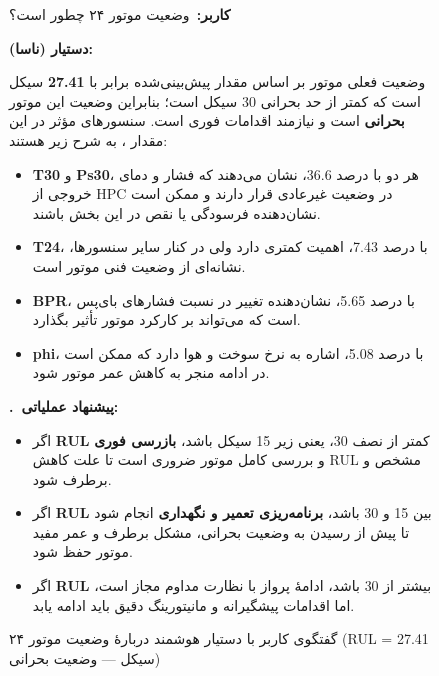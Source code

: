 \documentclass[a4paper,fleqn]{report}
\newcommand{\qaSection}[2]{%
  \vspace{6pt}%
  {\color{sectionColor}\textbf{#1.\ #2}}%
  \vspace{2pt}%
}
\begin{document}
\begin{figure}[h]
	\centering
	\begin{minipage}{0.95\textwidth}
		
		\begin{userBox}
			\textbf{کاربر:}\ وضعیت موتور ۲۴ چطور است؟
		\end{userBox}
		
		\begin{botBox}
			\textbf{دستیار (ناسا):}
			
			\medskip
			وضعیت فعلی موتور بر اساس مقدار پیش‌بینی‌شده
			برابر با \textbf{27.41} سیکل است که کمتر از حد بحرانی 30 سیکل است؛
			بنابراین وضعیت این موتور \textbf{بحرانی} است
			و نیازمند اقدامات فوری است. سنسورهای مؤثر در این مقدار ،
			به شرح زیر هستند:
			
			\begin{itemize}[rightmargin=1.5em, topsep=3pt, itemsep=4pt]
				\item \textbf{T30} و \textbf{Ps30}، هر دو با درصد 36.6، نشان می‌دهند که فشار و دمای
				خروجی از HPC در وضعیت غیرعادی قرار دارند و ممکن است نشان‌دهنده فرسودگی یا نقص
				در این بخش باشند.
				\item \textbf{T24}، با درصد 7.43، اهمیت کمتری دارد ولی در کنار سایر سنسورها، نشانه‌ای از
				وضعیت فنی موتور است.
				\item \textbf{BPR}، با درصد 5.65، نشان‌دهنده تغییر در نسبت فشارهای بای‌پس است که می‌تواند
				بر کارکرد موتور تأثیر بگذارد.
				\item \textbf{phi}، با درصد 5.08، اشاره به نرخ سوخت و هوا دارد که ممکن است در ادامه منجر
				به کاهش عمر موتور شود.
			\end{itemize}
			
			\medskip
			\qaSection{}{پیشنهاد عملیاتی:}
			
			\begin{itemize}[rightmargin=1.5em, topsep=3pt, itemsep=4pt]
				\item اگر \textbf{RUL} کمتر از نصف 30، یعنی زیر 15 سیکل باشد،
				\textbf{بازرسی فوری} و بررسی کامل موتور ضروری است
				تا علت کاهش RUL مشخص و برطرف شود.
				\item اگر \textbf{RUL} بین 15 و 30 باشد، \textbf{برنامه‌ریزی
						تعمیر و نگهداری} انجام شود تا پیش از رسیدن به وضعیت بحرانی، مشکل برطرف و عمر
				مفید موتور حفظ شود.
				\item اگر \textbf{RUL} بیشتر از 30 باشد، ادامهٔ پرواز با نظارت مداوم مجاز است، اما
				اقدامات پیشگیرانه و مانیتورینگ دقیق باید ادامه یابد.
			\end{itemize}
			
		\end{botBox}
		
	\end{minipage}
	\caption{گفتگوی کاربر با دستیار هوشمند دربارهٔ وضعیت موتور ۲۴ (RUL = 27.41 سیکل — وضعیت بحرانی)}
	\label{qa:llm-engine-query-24}
\end{figure}
\end{document}
